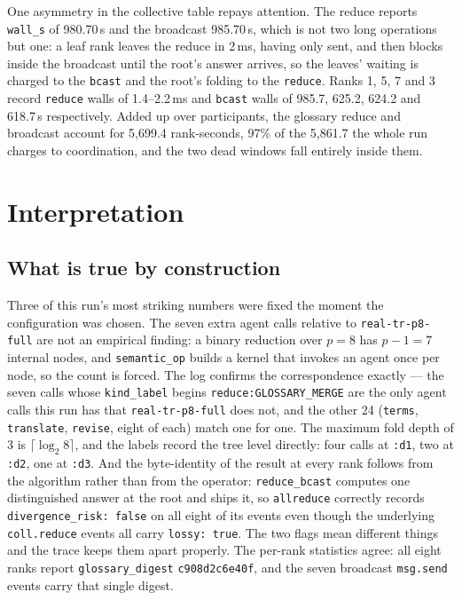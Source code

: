 \documentclass[11pt]{article}
\begin{document}
One asymmetry in the collective table repays attention. The reduce reports \texttt{wall\_s} of
980.70\,s and the broadcast 985.70\,s, which is not two long operations but one: a leaf rank
leaves the reduce in 2\,ms, having only sent, and then blocks inside the broadcast until the
root's answer arrives, so the leaves' waiting is charged to the \texttt{bcast} and the root's
folding to the \texttt{reduce}. Ranks 1, 5, 7 and 3 record \texttt{reduce} walls of 1.4--2.2\,ms
and \texttt{bcast} walls of 985.7, 625.2, 624.2 and 618.7\,s respectively. Added up over
participants, the glossary reduce and broadcast account for 5{,}699.4 rank-seconds, 97\% of the
5{,}861.7 the whole run charges to coordination, and the two dead windows fall entirely inside
them.

\section{Interpretation}

\subsection{What is true by construction}

Three of this run's most striking numbers were fixed the moment the configuration was chosen.
The seven extra agent calls relative to \texttt{real-tr-p8-full} are not an empirical finding:
a binary reduction over $p=8$ has $p-1=7$ internal nodes, and \texttt{semantic\_op} builds a
kernel that invokes an agent once per node, so the count is forced. The log confirms the
correspondence exactly --- the seven calls whose \texttt{kind\_label} begins
\texttt{reduce:GLOSSARY\_MERGE} are the only agent calls this run has that
\texttt{real-tr-p8-full} does not, and the other 24 (\texttt{terms}, \texttt{translate},
\texttt{revise}, eight of each) match one for one. The maximum fold depth of 3 is
$\lceil\log_2 8\rceil$, and the labels record the tree level directly: four calls at
\texttt{:d1}, two at \texttt{:d2}, one at \texttt{:d3}. And the byte-identity of the result at
every rank follows from the algorithm rather than from the operator: \texttt{reduce\_bcast}
computes one distinguished answer at the root and ships it, so \texttt{allreduce} correctly
records \texttt{divergence\_risk: false} on all eight of its events even though the underlying
\texttt{coll.reduce} events all carry \texttt{lossy: true}. The two flags mean different things
and the trace keeps them apart properly. The per-rank statistics agree: all eight ranks report
\texttt{glossary\_digest} \texttt{c908d2c6e40f}, and the seven broadcast \texttt{msg.send}
events carry that single digest.
\end{document}
